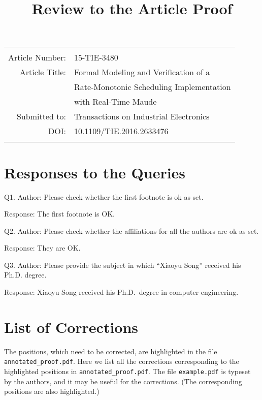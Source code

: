 \documentclass[12pt,onecolumn]{IEEEtranTIE}
\begin{document}
\title{Review to the Article Proof}
\date{}

\maketitle
\vspace{-30pt}
\begin{center}
  \begin{tabular}{r l}
    \hline\hline
    & \\
    Article Number: & 15-TIE-3480\\
    Article Title: & Formal Modeling and Verification of a \\
    & Rate-Monotonic Scheduling Implementation \\
    & with Real-Time Maude \\
    Submitted to: & Transactions on Industrial Electronics \\
    DOI: & 10.1109/TIE.2016.2633476 \\
    & \\
    \hline\hline
  \end{tabular}
  \bigskip
\end{center}

\newcommand{\by}{$\rightarrow$ }

\section{Responses to the Queries}

\bigskip
Q1. Author: Please check whether the first footnote is ok as set.

Response: The first footnote is OK.

\bigskip
Q2. Author: Please check whether the affiliations for all the authors
are ok as set.

Response: They are OK. 

\bigskip
Q3. Author: Please provide the subject in which ``Xiaoyu Song'' received
his Ph.D. degree.

Response: Xiaoyu Song received his Ph.D.\ degree in computer
engineering.


\section{List of Corrections}

\medskip
The positions, which need to be corrected, are highlighted in the file
\verb|annotated_proof.pdf|. Here we list all the corrections
corresponding to the highlighted positions in
\verb|annotated_proof.pdf|. The file \verb|example.pdf| is typeset by
the authors, and it may be useful for the corrections. (The
corresponding positions are also highlighted.)
\end{document}
